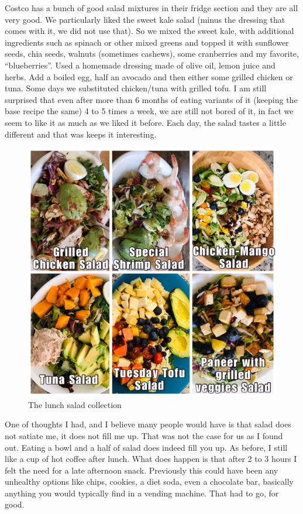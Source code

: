 \documentclass[
  oneside]{book}
\begin{document}
Costco has a bunch of good salad mixtures in their fridge section and they are all very good. We particularly liked the sweet kale salad (minus the dressing that comes with it, we did not use that). So we mixed the sweet kale, with additional ingredients such as spinach or other mixed greens and topped it with sunflower seeds, chia seeds, walnuts (sometimes cashews), some cranberries and my favorite, ``blueberries''. Used a homemade dressing made of olive oil, lemon juice and herbs. Add a boiled egg, half an avocado and then either some grilled chicken or tuna. Some days we substituted chicken/tuna with grilled tofu. I am still surprised that even after more than 6 months of eating variants of it (keeping the base recipe the same) 4 to 5 times a week, we are still not bored of it, in fact we seem to like it as much as we liked it before. Each day, the salad tastes a little different and that was keeps it interesting.

\begin{figure}
\centering
\includegraphics{pictures/lunch-salads.JPG}
\caption{The lunch salad collection}
\end{figure}

One of thoughts I had, and I believe many people would have is that salad does not satiate me, it does not fill me up. That was not the case for us as I found out. Eating a bowl and a half of salad does indeed fill you up. As before, I still like a cup of hot coffee after lunch. What does happen is that after 2 to 3 hours I felt the need for a late afternoon snack. Previously this could have been any unhealthy options like chips, cookies, a diet soda, even a chocolate bar, basically anything you would typically find in a vending machine. That had to go, for good.
\end{document}
